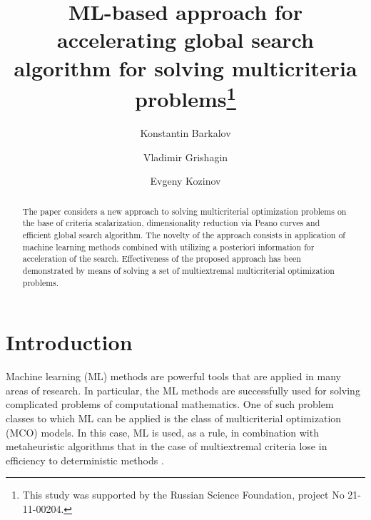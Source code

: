 \documentclass[runningheads]{llncs}
\begin{document}
%
\title{ML-based approach for accelerating global search algorithm for solving multicriteria problems\thanks{This study was supported by the Russian Science Foundation, project No 21-11-00204.}}
%
%
\author{Konstantin Barkalov \and
Vladimir Grishagin \and
Evgeny Kozinov}
%
%
%
\maketitle              %
%
\begin{abstract}
The paper considers a new approach to solving multicriterial optimization problems on the base of criteria scalarization, dimensionality reduction via Peano curves and efficient global search algorithm. The novelty of the approach consists in application of machine learning methods combined with utilizing a posteriori information for acceleration of the search. Effectiveness of the proposed approach has been demonstrated by means of solving a set of multiextremal multicriterial optimization problems.

\end{abstract}
%
%
%
\section{Introduction}
Machine learning (ML) methods are powerful tools that are applied in many areas of research.
In particular, the ML methods are successfully used for solving complicated problems of computational mathematics. One of such problem classes to which ML can be applied is the class of multicriterial optimization (MCO) models. 
In this case, ML is used, as a rule, in combination with metaheuristic algorithms \cite{Subraveti2019} that in the case of multiextremal criteria lose in efficiency to deterministic methods \cite{Kvasov2018,Sergeyev2018}.
\end{document}
